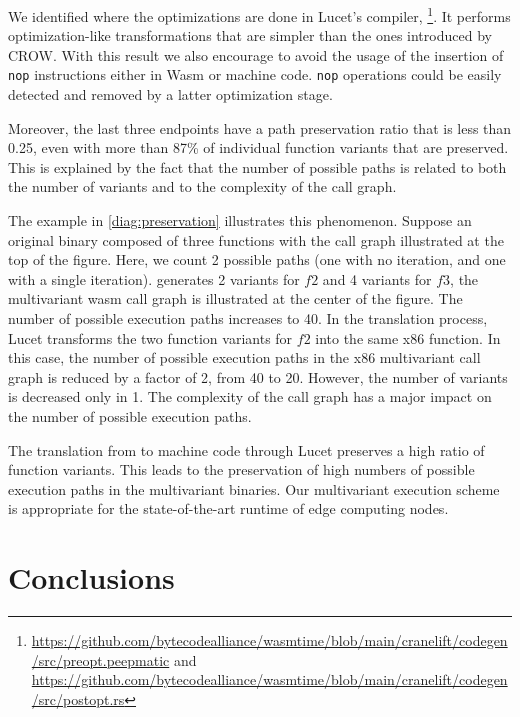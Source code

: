 We identified where the optimizations are done in Lucet's compiler, \footnote{\url{https://github.com/bytecodealliance/wasmtime/blob/main/cranelift/codegen/src/preopt.peepmatic} and \url{https://github.com/bytecodealliance/wasmtime/blob/main/cranelift/codegen/src/postopt.rs}}. It performs optimization-like transformations that are simpler than the ones introduced by CROW. 
With this result we also encourage to avoid the usage of the insertion of \texttt{nop} instructions either in Wasm  or machine code. \texttt{nop} operations could be easily detected and removed by a latter optimization stage.



Moreover, the last three endpoints have a path preservation ratio that is less than 0.25, even with more than 87\%  of individual function  variants that are preserved. This is explained by the fact that the number of possible paths is related to both the number of variants and to the complexity of the call graph.



The example in \autoref{diag:preservation}  illustrates this phenomenon.
Suppose an original binary composed of three functions with the call graph illustrated at the top of the figure. Here, we count 2 possible paths (one with no iteration, and one with a single iteration).
\tool generates 2 variants for $f2$ and 4 variants for $f3$, the multivariant wasm call graph is illustrated at the center of the figure. The number of possible execution paths increases to 40.
In the translation process, Lucet transforms the two \wasm function variants for $f2$ into the same x86 function.
In this case, the number of possible execution paths in the x86 multivariant call graph is reduced by a factor of 2, from 40 to 20.
However, the number of variants is decreased only in 1. 
The complexity of the call graph has a major impact on the number of possible execution paths. 


	The translation from \wasm to machine code through Lucet preserves a high ratio of function variants. This leads to the preservation of high numbers of possible execution paths in the multivariant binaries. 
	Our multivariant execution scheme is appropriate for the state-of-the-art runtime of edge computing nodes.


\section{Conclusions}


